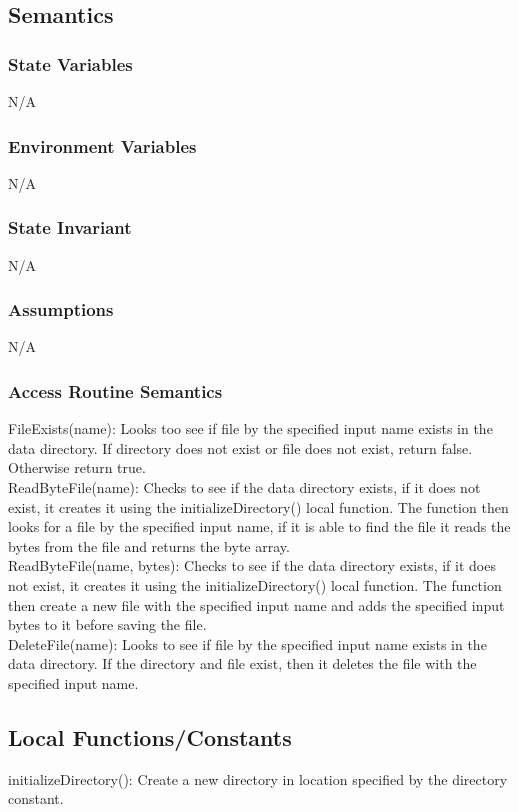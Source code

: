 \documentclass[12pt]{article}
\begin{document}
\subsection{Semantics}
\subsubsection{State Variables}
N/A
\subsubsection{Environment Variables}
N/A
\subsubsection{State Invariant}
N/A
\subsubsection{Assumptions}
N/A

\subsubsection{Access Routine Semantics}
\noindent FileExists(name): Looks too see if file by the specified input name exists in the data directory. If directory does not exist or file does not exist, return false. Otherwise return true.\\

\noindent ReadByteFile(name): Checks to see if the data directory exists, if it does not exist, it creates it using the initializeDirectory() local function. The function then looks for a file by the specified input name, if it is able to find the file it reads the bytes from the file and returns the byte array.\\

\noindent ReadByteFile(name, bytes): Checks to see if the data directory exists, if it does not exist, it creates it using the initializeDirectory() local function. The function then create a new file with the specified input name and adds the specified input bytes to it before saving the file.\\

\noindent DeleteFile(name): Looks to see if file by the specified input name exists in the data directory. If the directory and file exist, then it deletes the file with the specified input name.\\

\subsection{Local Functions/Constants}
\noindent initializeDirectory(): Create a new directory in location specified by the directory constant.
\end{document}
